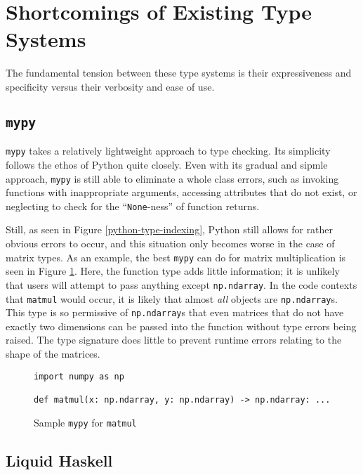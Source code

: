 \documentclass{article}
\begin{document}
\section{Shortcomings of Existing Type Systems}

The fundamental tension between these type systems is their expressiveness and specificity versus their verbosity and ease of use.

\subsection{\texttt{mypy}}

\texttt{mypy} takes a relatively lightweight approach to type checking. Its simplicity follows the ethos of Python quite closely. Even with its gradual  and sipmle approach, \texttt{mypy} is still able to eliminate a whole class errors, such as invoking functions with inappropriate arguments, accessing attributes that do not exist, or neglecting to check for the ``\texttt{None}-ness'' of function returns.

Still, as seen in Figure \ref{python-type-indexing}, Python still allows for rather obvious errors to occur, and this situation only becomes worse in the case of matrix types. As an example, the best \texttt{mypy} can do for matrix multiplication is seen in Figure \ref{python-type-matmul}. Here, the function type adds little information; it is unlikely that users will attempt to pass anything except \texttt{np.ndarray}. In the code contexts that \texttt{matmul} would occur, it is likely that almost \textit{all} objects are \texttt{np.ndarray}s. This type is so permissive of \texttt{np.ndarray}s that even matrices that do not have exactly two dimensions can be passed into the function without type errors being raised. The type signature does little to prevent runtime errors relating to the shape of the matrices.

\begin{figure}
    \centering
    \begin{verbatim}
import numpy as np

def matmul(x: np.ndarray, y: np.ndarray) -> np.ndarray: ...\end{verbatim}
    \caption{Sample \texttt{mypy} for \texttt{matmul}}
    \label{python-type-matmul}
\end{figure}


\subsection{Liquid Haskell}
\end{document}
